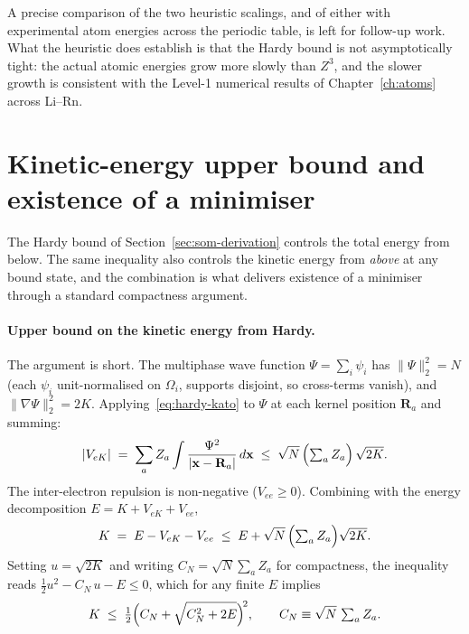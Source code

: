 A precise comparison of the two heuristic scalings, and of either with experimental atom energies across the periodic table, is left for follow-up work. What the heuristic does establish is that the Hardy bound is not asymptotically tight: the actual atomic energies grow more slowly than $Z^3$, and the slower growth is consistent with the Level-1 numerical results of Chapter~\ref{ch:atoms} across Li--Rn.

\section{Kinetic-energy upper bound and existence of a minimiser}\label{sec:existence}

The Hardy bound of Section~\ref{sec:som-derivation} controls the total energy from below. The same inequality also controls the kinetic energy from \emph{above} at any bound state, and the combination is what delivers existence of a minimiser through a standard compactness argument.

\paragraph{Upper bound on the kinetic energy from Hardy.}
The argument is short. The multiphase wave function $\Psi = \sum_i \psi_i$ has $\|\Psi\|_2^2 = N$ (each $\psi_i$ unit-normalised on $\Omega_i$, supports disjoint, so cross-terms vanish), and $\|\nabla \Psi\|_2^2 = 2K$. Applying~\eqref{eq:hardy-kato} to $\Psi$ at each kernel position $\mathbf{R}_a$ and summing:
\begin{equation}\label{eq:Vbound}
|V_{eK}| \;=\; \sum_a Z_a \int \frac{\Psi^2}{|\mathbf{x} - \mathbf{R}_a|}\, d\mathbf{x}
\;\le\; \sqrt{N}\,\Bigl(\textstyle\sum_a Z_a\Bigr)\, \sqrt{2K}.
\end{equation}
The inter-electron repulsion is non-negative ($V_{ee} \ge 0$). Combining with the energy decomposition $E = K + V_{eK} + V_{ee}$,
\begin{equation}
K \;=\; E - V_{eK} - V_{ee} \;\le\; E + \sqrt{N}\,\Bigl(\textstyle\sum_a Z_a\Bigr)\sqrt{2K}.
\end{equation}
Setting $u = \sqrt{2K}$ and writing $C_N = \sqrt{N}\sum_a Z_a$ for compactness, the inequality reads $\tfrac{1}{2}u^2 - C_N\, u - E \le 0$, which for any finite $E$ implies
\begin{equation}\label{eq:Kbound}
K \;\le\; \tfrac{1}{2}\Bigl(C_N + \sqrt{C_N^2 + 2E}\Bigr)^{\!2}, \qquad C_N \equiv \sqrt{N}\,\textstyle\sum_a Z_a.
\end{equation}

